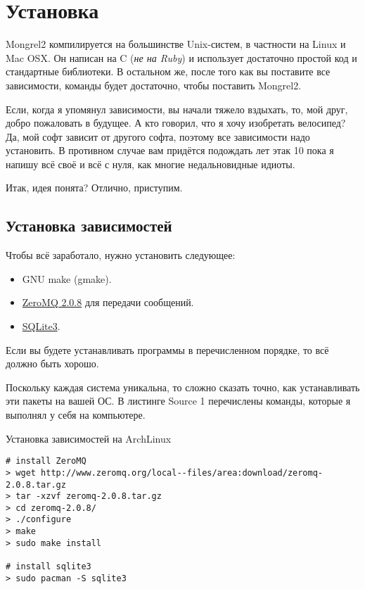 \chapter{Установка}

Mongrel2 компилируется на большинстве Unix-систем, в частности на Linux и Mac OSX.
Он написан на C (\emph{не на Ruby}) и использует достаточно простой код и стандартные
библиотеки. В остальном же, после того как вы поставите все зависимости,
команды  будет достаточно, чтобы поставить Mongrel2.

Если, когда я упомянул зависимости, вы начали тяжело вздыхать, то, мой друг,
добро пожаловать в будущее. А кто говорил, что я хочу изобретать велосипед?
Да, мой софт зависит от другого софта, поэтому все зависимости надо установить.
В противном случае вам придётся подождать лет этак 10 пока я напишу всё своё
и всё с нуля, как многие недальновидные идиоты.

Итак, идея понята? Отлично, приступим.

\section{Установка зависимостей}

Чтобы всё заработало, нужно установить следующее:

\begin{itemize}
\item GNU make (gmake).
\item \href{http://zeromq.org}{ZeroMQ 2.0.8} для передачи сообщений.
\item \href{http://www.sqlite.org/}{SQLite3}.
\end{itemize}

Если вы будете устанавливать программы в перечисленном порядке, то всё должно быть хорошо.

Поскольку каждая система уникальна, то сложно сказать точно, как устанавливать
эти пакеты на вашей ОС. В листинге Source 1 перечислены команды, которые я
выполнял у себя на компьютере.

\begin{code}{Установка зависимостей на ArchLinux}
\begin{lstlisting}
# install ZeroMQ
> wget http://www.zeromq.org/local--files/area:download/zeromq-2.0.8.tar.gz
> tar -xzvf zeromq-2.0.8.tar.gz
> cd zeromq-2.0.8/
> ./configure
> make
> sudo make install

# install sqlite3
> sudo pacman -S sqlite3
\end{lstlisting}
\end{code}

